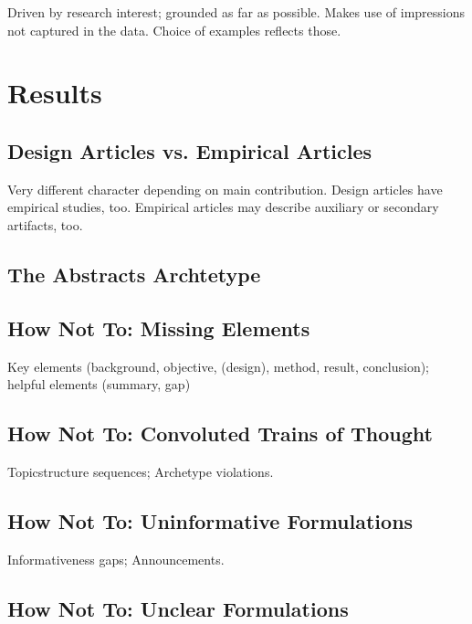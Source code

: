 \documentclass[10pt,journal,compsoc]{IEEEtran}
\begin{document}
\noindent
Driven by research interest; grounded as far as possible.
Makes use of impressions not captured in the data.
Choice of examples reflects those.


\section{Results}

\subsection{Design Articles vs. Empirical Articles}

\noindent
Very different character depending on main contribution.
Design articles have empirical studies, too.
Empirical articles may describe auxiliary or secondary artifacts, too.


\subsection{The Abstracts Archtetype}

\noindent



\subsection{How Not To: Missing Elements}

\noindent
Key elements (background, objective, (design), method, result, conclusion); helpful elements (summary, gap)


\subsection{How Not To: Convoluted Trains of Thought}

\noindent
Topicstructure sequences; Archetype violations.


\subsection{How Not To: Uninformative Formulations}

\noindent
Informativeness gaps; Announcements.


\subsection{How Not To: Unclear Formulations}
\end{document}
